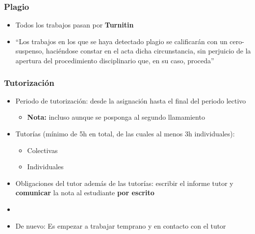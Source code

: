\documentclass[utf8, xcolor=dvipsnames]{beamer}
\begin{document}
\begin{frame}
\frametitle{Plagio}
\centering

\begin{itemize}
  \item Todos los trabajos pasan por \textbf{Turnitin}
  \item ``Los trabajos en los que se haya detectado plagio se calificarán con un cero-suspenso, haciéndose constar en el acta dicha circunstancia, sin perjuicio de la apertura del procedimiento disciplinario que, en su caso, proceda''
\end{itemize}


\end{frame}

\begin{frame}
\frametitle{Tutorización}
\centering

\begin{itemize}
  \item Periodo de tutorización: desde la asignación hasta el final del periodo lectivo
  \begin{itemize}
    \item \textbf{Nota:} incluso aunque se posponga al segundo llamamiento
  \end{itemize}
  \item Tutorías (mínimo de 5h en total, de las cuales al menos 3h individuales):
  \begin{itemize}
    \item Colectivas
    \item Individuales
  \end{itemize}
  \item Obligaciones del tutor además de las tutorías: escribir el informe tutor y \textbf{comunicar} la nota al estudiante \textbf{por escrito}
  \item[]
  \item De nuevo: Es \textbf{{\color{red}{importante}}} empezar a trabajar temprano y en contacto con el tutor
\end{itemize}

\end{frame}
\end{document}
